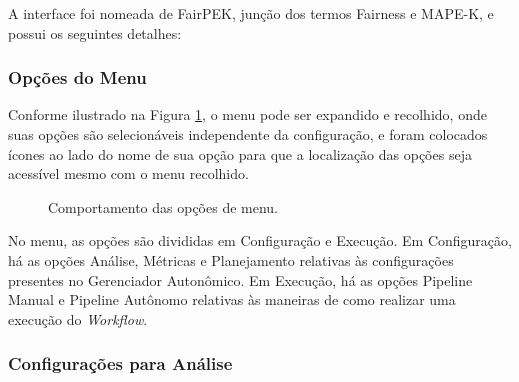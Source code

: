 \documentclass[portugues]{ic-tese}
\begin{document}
A interface foi nomeada de FairPEK, junção dos termos Fairness e MAPE-K, e possui os seguintes detalhes:

\subsubsection{Opções do Menu}

Conforme ilustrado na Figura \ref{fig:opcoesMenu}, o menu pode ser expandido e recolhido, onde suas opções são selecionáveis independente da configuração, e foram colocados ícones ao lado do nome de sua opção para que a localização das opções seja acessível mesmo com o menu recolhido.

\begin{figure}[H]
    \centering
    \caption{Comportamento das opções de menu.}
    \label{fig:opcoesMenu}
\end{figure}

No menu, as opções são divididas em Configuração e Execução. Em Configuração, há as opções Análise, Métricas e Planejamento relativas às configurações presentes no Gerenciador Autonômico. Em Execução, há as opções Pipeline Manual e Pipeline Autônomo relativas às maneiras de como realizar uma execução do \textit{Workflow}.

\subsubsection{Configurações para Análise}
\end{document}
